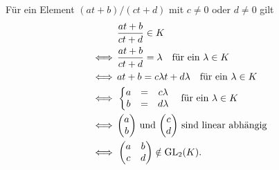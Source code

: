 \documentclass[a4paper,10pt,numbers=noenddot]{scrartcl}
\begin{document}
Für ein Element $(at+b)/(ct+d)$ mit $c \neq 0$ oder $d \neq 0$ gilt
\begin{align*}
      &\, \frac{at+b}{ct+d} \in K
  \\
  \iff&\, \frac{at+b}{ct+d} = \lambda       \quad \text{für ein $\lambda \in K$}
  \\
  \iff&\, at + b = c \lambda t + d \lambda  \quad \text{für ein $\lambda \in K$}
  \\
  \iff&\, \left\{
            \begin{matrix}
              a &=& c \lambda
              \\
              b &=& d \lambda
            \end{matrix}
          \right.                           \quad \text{für ein $\lambda \in K$}
  \\
  \iff&\, \text{$\begin{pmatrix} a \\ b \end{pmatrix}$ und $\begin{pmatrix} c \\ d \end{pmatrix}$ sind linear abhängig}
  \\
  \iff&\, \begin{pmatrix}
            a & b
            \\
            c & d
          \end{pmatrix}
          \notin \operatorname{GL}_2(K).
\end{align*}
\end{document}

